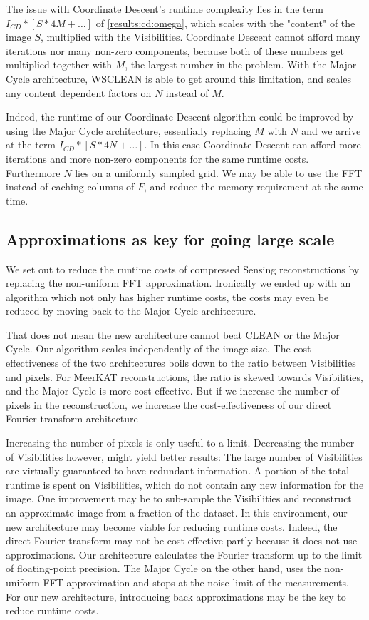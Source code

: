 The issue with Coordinate Descent's runtime complexity lies in the term $I_{CD} * [S * 4M +\ldots]$ of \eqref{results:cd:omega}, which scales with the "content" of the image $S$, multiplied with the Visibilities. Coordinate Descent cannot afford many iterations nor many non-zero components, because both of these numbers get multiplied together with $M$, the largest number in the problem. With the Major Cycle architecture, WSCLEAN is able to get around this limitation, and scales any content dependent factors on $N$ instead of $M$. 

Indeed, the runtime of our Coordinate Descent algorithm could be improved by using the Major Cycle architecture, essentially replacing $M$ with $N$ and we arrive at the term $I_{CD} * [S * 4N +\ldots]$. In this case Coordinate Descent can afford more iterations and more non-zero components for the same runtime costs. Furthermore $N$ lies on a uniformly sampled grid. We may be able to use the FFT instead of caching columns of $F$, and reduce the memory requirement at the same time.


\subsection{Approximations as key for going large scale}
We set out to reduce the runtime costs of compressed Sensing reconstructions by replacing the non-uniform FFT approximation. Ironically we ended up with an algorithm which not only has higher runtime costs, the costs may even be reduced by moving back to the Major Cycle architecture.

That does not mean the new architecture cannot beat CLEAN or the Major Cycle. Our algorithm scales independently of the image size. The cost effectiveness of the two architectures boils down to the ratio between Visibilities and pixels. For MeerKAT reconstructions, the ratio is skewed towards Visibilities, and the Major Cycle is more cost effective. But if we increase the number of pixels in the reconstruction, we increase the cost-effectiveness of our direct Fourier transform architecture

Increasing the number of pixels is only useful to a limit. Decreasing the number of Visibilities however, might yield better results: The large number of Visibilities are virtually guaranteed to have redundant information. A portion of the total runtime is spent on Visibilities, which do not contain any new information for the image. One improvement may be to sub-sample the Visibilities and reconstruct an approximate image from a fraction of the dataset. In this environment, our new architecture may become viable for reducing runtime costs. Indeed, the direct Fourier transform may not be cost effective partly because it does not use approximations. Our architecture calculates the Fourier transform up to the limit of floating-point precision. The Major Cycle on the other hand, uses the non-uniform FFT approximation and stops at the noise limit of the measurements. For our new architecture, introducing back approximations may be the key to reduce runtime costs.

